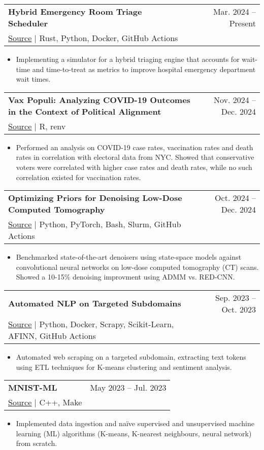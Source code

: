 \documentclass[letterpaper,11pt]{article}
\makeatletter
\newcommand{\resumeItem}[1]{
  \item\small{
    {#1 \vspace{-2pt}}
  }
}
\newcommand{\resumeProjectHeading}[4]{ %
    \item
    \begin{tabular*}{0.97\textwidth}{l@{\extracolsep{\fill}}r}
      \small\textbf{#1} & #2 \\
    \small\href{#3}{{\footnotesize\faGithub} \underline{Source}} $|$ #4 & \\ %
    \end{tabular*}\vspace{-7pt}
}
\newcommand{\resumeItemListStart}{\begin{itemize}}
\newcommand{\resumeItemListEnd}{\end{itemize}\vspace{-5pt}}
\makeatother
\begin{document}
        \resumeProjectHeading
          {Hybrid Emergency Room Triage Scheduler}
          {Mar. 2024 -- Present}
          {https://github.com/john-s-lin/desert} %
          {Rust, Python, Docker, GitHub Actions} %
          \resumeItemListStart
            \resumeItem{Implementing a simulator for a hybrid triaging engine that accounts for wait-time and time-to-treat as metrics to improve hospital emergency department wait times.}
          \resumeItemListEnd

        \resumeProjectHeading
          {Vax Populi: Analyzing COVID-19 Outcomes in the Context of Political Alignment}
          {Nov. 2024 -- Dec. 2024}
          {https://github.com/john-s-lin/vax-populi} %
          {R, renv} %
          \resumeItemListStart
            \resumeItem{Performed an analysis on COVID-19 case rates, vaccination rates and death rates in correlation with electoral data from NYC. Showed that conservative voters were correlated with higher case rates and death rates, while no such correlation existed for vaccination rates.}
          \resumeItemListEnd
          
        \resumeProjectHeading
          {Optimizing Priors for Denoising Low-Dose Computed Tomography}
          {Oct. 2024 -- Dec. 2024}
          {https://github.com/john-s-lin/mambagym} %
          {Python, PyTorch, Bash, Slurm, GitHub Actions} %
          \resumeItemListStart
            \resumeItem{Benchmarked state-of-the-art denoisers using state-space models against convolutional neural networks on low-dose computed tomography (CT) scans. Showed a 10-15\% denoising improvment using ADMM vs. RED-CNN.}
          \resumeItemListEnd

      \resumeProjectHeading
          {Automated NLP on Targeted Subdomains}
          {Sep. 2023 -- Oct. 2023}
          {https://github.com/john-s-lin/nonsense-sentiment-scraper} %
          {Python, Docker, Scrapy, Scikit-Learn, AFINN, GitHub Actions} %
          \resumeItemListStart
            \resumeItem{Automated web scraping on a targeted subdomain, extracting text tokens using ETL techniques for K-means clustering and sentiment analysis.}
          \resumeItemListEnd

      \resumeProjectHeading
          {MNIST-ML}
          {May 2023 -- Jul. 2023}
          {https://github.com/john-s-lin/mnist-ml} %
          {C++, Make} %
          \resumeItemListStart
            \resumeItem{Implemented data ingestion and naïve supervised and unsupervised machine learning (ML) algorithms (K-means, K-nearest neighbours, neural network) from scratch.}
          \resumeItemListEnd
\end{document}
